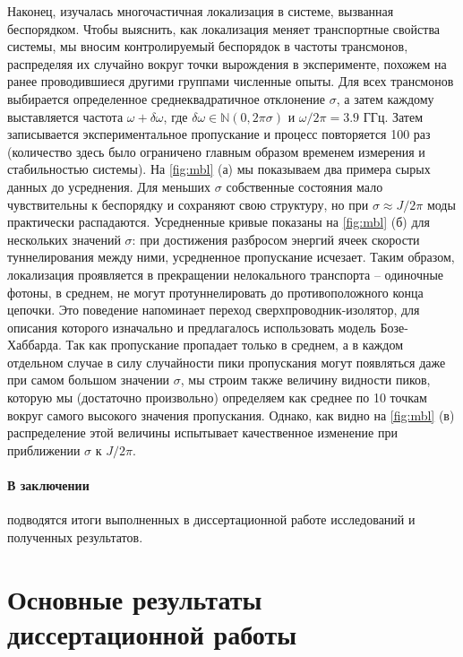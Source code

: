\documentclass[14pt, a4paper]{extarticle}
\begin{document}
Наконец, изучалась многочастичная локализация в системе, вызванная беспорядком. Чтобы выяснить, как локализация меняет транспортные свойства системы, мы вносим контролируемый беспорядок в частоты трансмонов, распределяя их случайно вокруг точки вырождения в эксперименте, похожем на ранее проводившиеся другими группами численные опыты. Для всех трансмонов выбирается определенное среднеквадратичное отклонение $\sigma$, а затем каждому выставляется частота $\omega + \delta \omega$, где $\delta \omega \in \mathbb{N}(0, 2\pi \sigma)$ и $\omega/2\pi = 3.9$ ГГц. Затем записывается экспериментальное пропускание и процесс повторяется 100 раз (количество здесь было ограничено главным образом временем измерения и стабильностью системы). На \autoref{fig:mbl} (а) мы показываем два примера сырых данных до усреднения. Для меньших $\sigma$ собственные состояния мало чувствительны к беспорядку и сохраняют свою структуру, но при $\sigma \approx J/2\pi$ моды практически распадаются. Усредненные кривые показаны на \autoref{fig:mbl} (б) для нескольких значений $\sigma$: при достижения разбросом энергий ячеек скорости туннелирования между ними, усредненное пропускание исчезает. Таким образом, локализация проявляется в прекращении нелокального транспорта -- одиночные фотоны, в среднем, не могут протуннелировать до противоположного конца цепочки. Это поведение напоминает переход сверхпроводник-изолятор, для описания которого изначально и предлагалось использовать модель Бозе-Хаббарда. Так как пропускание пропадает только в среднем, а в каждом отдельном случае в силу случайности пики пропускания могут появляться даже при самом большом значении $\sigma$, мы строим также величину видности пиков, которую мы (достаточно произвольно) определяем как среднее по 10 точкам вокруг самого высокого значения пропускания. Однако, как видно на \autoref{fig:mbl} (в) распределение этой величины испытывает качественное изменение при приближении $\sigma$ к $J/2\pi$.

\paragraph{В заключении} подводятся итоги выполненных в диссертационной работе исследований и полученных результатов.
	
\section*{Основные результаты диссертационной работы}
\end{document}
